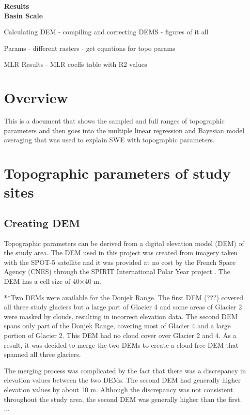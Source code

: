 \documentclass[12pt]{article}
\begin{document}

\begin{center}
\Large \textbf{Results\\ Basin Scale}
\end{center}

Calculating DEM
- compiling and correcting DEMS
- figures of it all

Params
- different rasters
- get equations for topo params

MLR Results
- MLR coeffs table with R2 values

\section*{Overview}
This is a document that shows the sampled and full ranges of topographic parameters and then goes into the multiple linear regression and Bayesian model averaging that was used to explain SWE with topographic parameters. 

\tableofcontents
\pagebreak

\section{Topographic parameters of study sites}

\subsection{Creating DEM}

Topographic parameters can be derived from a digital elevation model (DEM) of the study area. The DEM used in this project was created from imagery taken with the SPOT-5 satellite and it was provided at no cost by the French Space Agency (CNES) through the SPIRIT International Polar Year project \citep{Korona2009}. The DEM has a cell size of 40$\times$40 m. 

**Two DEMs were available for the Donjek Range. The first DEM (???) covered all three study glaciers but a large part of Glacier 4 and some areas of Glacier 2 were masked by clouds, resulting in incorrect elevation data. The second DEM spans only part of the Donjek Range, covering most of Glacier 4 and a large portion of Glacier 2. This DEM had no cloud cover over Glacier 2 and 4. As a result, it was decided to merge the two DEMs to create a cloud free DEM that spanned all three glaciers. 

The merging process was complicated by the fact that there was a discrepancy in elevation values between the two DEMs. The second DEM had generally higher elevation values by about 10 m. Although the discrepancy was not consistent throughout the study area, the second DEM was generally higher than the first. ...
\end{document}
